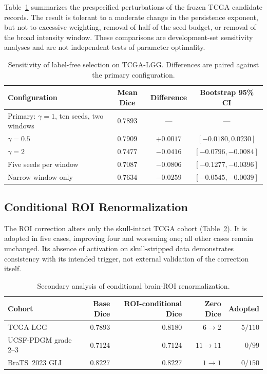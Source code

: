 \documentclass[11pt,a4paper]{article}
\begin{document}
Table~\ref{tab:robustness-supp} summarizes the prespecified perturbations of the
frozen TCGA candidate records. The result is tolerant to a moderate change in
the persistence exponent, but not to excessive weighting, removal of half of the
seed budget, or removal of the broad intensity window. These comparisons are
development-set sensitivity analyses and are not independent tests of parameter
optimality.

\begin{table}[htbp]\centering
\caption{Sensitivity of label-free selection on TCGA-LGG. Differences are paired
against the primary configuration.}\label{tab:robustness-supp}
\begin{tabular}{lccc}
\toprule
Configuration & Mean Dice & Difference & Bootstrap 95\% CI \\
\midrule
Primary: $\gamma=1$, ten seeds, two windows & $0.7893$ & --- & --- \\
$\gamma=0.5$ & $0.7909$ & $+0.0017$ & $[-0.0180,0.0230]$ \\
$\gamma=2$ & $0.7477$ & $-0.0416$ & $[-0.0796,-0.0084]$ \\
Five seeds per window & $0.7087$ & $-0.0806$ & $[-0.1277,-0.0396]$ \\
Narrow window only & $0.7634$ & $-0.0259$ & $[-0.0545,-0.0039]$ \\
\bottomrule
\end{tabular}
\end{table}

\subsection{Conditional ROI Renormalization}

The ROI correction alters only the skull-intact TCGA cohort
(Table~\ref{tab:roi}). It is adopted in five cases, improving four and worsening
one; all other cases remain unchanged. Its absence of activation on skull-stripped
data demonstrates consistency with its intended trigger, not external validation
of the correction itself.

\begin{table}[htbp]\centering
\caption{Secondary analysis of conditional brain-ROI renormalization.}
\label{tab:roi}
\begin{tabular}{lrrrr}
\toprule
Cohort & Base Dice & ROI-conditional Dice & Zero Dice & Adopted \\
\midrule
TCGA-LGG & $0.7893$ & $0.8180$ & $6\rightarrow2$ & $5/110$ \\
UCSF-PDGM grade 2--3 & $0.7124$ & $0.7124$ & $11\rightarrow11$ & $0/99$ \\
BraTS~2023 GLI & $0.8227$ & $0.8227$ & $1\rightarrow1$ & $0/150$ \\
\bottomrule
\end{tabular}
\end{table}
\end{document}
